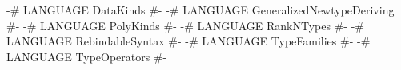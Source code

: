 \begin{code}
{-# LANGUAGE DataKinds                  #-}
{-# LANGUAGE GeneralizedNewtypeDeriving #-}
{-# LANGUAGE PolyKinds                  #-}
{-# LANGUAGE RankNTypes                 #-}
{-# LANGUAGE RebindableSyntax           #-}
{-# LANGUAGE TypeFamilies               #-}
{-# LANGUAGE TypeOperators              #-}
\end{code}
